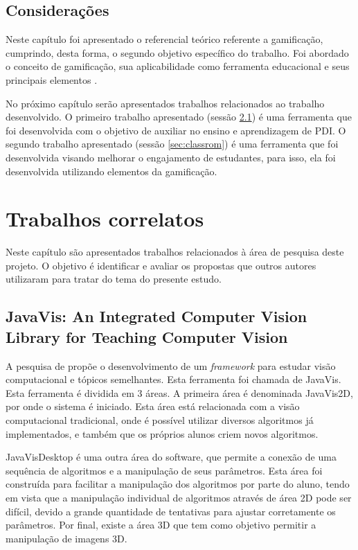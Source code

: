 \documentclass[
	12pt,				%
	oneside,			%
	a4paper,			%
	english,			%
	french,				%
	spanish,			%
	brazil,				%
	]{abntex2}
\begin{document}
\section{Considerações}

Neste capítulo foi apresentado o referencial teórico referente a gamificação, cumprindo, desta forma, o segundo objetivo específico do trabalho. Foi abordado o conceito de gamificação, sua aplicabilidade como ferramenta educacional e seus principais elementos .

No próximo capítulo serão apresentados trabalhos relacionados ao trabalho desenvolvido. O primeiro trabalho apresentado (sessão \ref{sec:javavis}) é uma ferramenta que foi desenvolvida com o objetivo de auxiliar no ensino e aprendizagem de PDI. O segundo trabalho apresentado (sessão \ref{sec:classrom}) é uma ferramenta que foi desenvolvida visando melhorar o engajamento de estudantes, para isso, ela foi desenvolvida utilizando elementos da gamificação.

\chapter{Trabalhos correlatos}

Neste capítulo são apresentados trabalhos relacionados à área de pesquisa deste projeto. O objetivo é identificar e avaliar os propostas que outros autores utilizaram para tratar do tema do presente estudo.

\section{JavaVis: An Integrated Computer Vision Library for Teaching Computer Vision}
\label{sec:javavis}

A pesquisa de \citet{cazorla2015javavis} propõe o desenvolvimento de um \textit{framework} para estudar visão computacional e tópicos semelhantes. Esta ferramenta foi chamada de JavaVis. Esta ferramenta é dividida em 3 áreas. A primeira área é denominada JavaVis2D, por onde o sistema é iniciado. Esta área está relacionada com a visão computacional tradicional, onde é possível utilizar diversos algoritmos já implementados, e também que os próprios alunos criem novos algoritmos. 

JavaVisDesktop é uma outra área do software, que permite a conexão de uma sequência de algoritmos e a manipulação de seus parâmetros. Esta área foi construída para facilitar a manipulação dos algoritmos por parte do aluno, tendo em vista que a manipulação individual de algoritmos através de área 2D pode ser difícil, devido a grande quantidade de tentativas para ajustar corretamente os parâmetros. Por final, existe a área 3D que tem como objetivo permitir a manipulação de imagens 3D.
\end{document}
